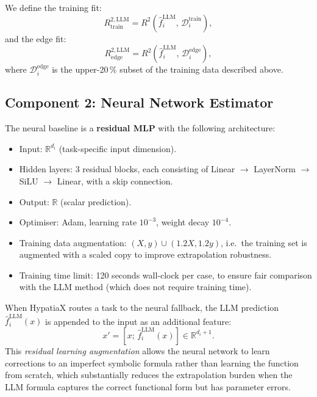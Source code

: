 \documentclass[twoside,11pt]{article}
\newcommand{\Rsq}{R^{2}}
\begin{document}
We define the training fit:
\begin{equation}
  {R^{2,\mathrm{LLM}}_{\mathrm{train}}} = \Rsq\!\left(\hat{f}^{\mathrm{LLM}}_i,\,
  \mathcal{D}^{\mathrm{train}}_i\right),
  \label{eq:r2_train_llm}
\end{equation}
and the edge fit:
\begin{equation}
  {R^{2,\mathrm{LLM}}_{\mathrm{edge}}} = \Rsq\!\left(\hat{f}^{\mathrm{LLM}}_i,\,
  \mathcal{D}^{\mathrm{edge}}_i\right),
  \label{eq:r2_edge_llm}
\end{equation}
where $\mathcal{D}^{\mathrm{edge}}_i$ is the upper-20\,\% subset of the training
data described above.

\subsection{Component 2: Neural Network Estimator}\label{subsec:component-2-neural-network-estimator}
\label{sec:nn}

The neural baseline is a \textbf{residual MLP} with the following architecture:
\begin{itemize}
  \item Input: $\mathbb{R}^{d_i}$ (task-specific input dimension).
  \item Hidden layers: 3 residual blocks, each consisting of Linear $\to$
    LayerNorm $\to$ SiLU $\to$ Linear, with a skip connection.
  \item Output: $\mathbb{R}$ (scalar prediction).
  \item Optimiser: Adam, learning rate $10^{-3}$, weight decay $10^{-4}$.
  \item Training data augmentation: $(X, y) \cup (1.2X, 1.2y)$, i.e.\ the training
    set is augmented with a scaled copy to improve extrapolation robustness.
  \item Training time limit: 120 seconds wall-clock per case, to ensure
    fair comparison with the LLM method (which does not require training time).
\end{itemize}

When HypatiaX routes a task to the neural fallback, the LLM prediction
$\hat{f}^{\mathrm{LLM}}_i(x)$ is appended to the input as an additional feature:
\begin{equation}
  x' = [x;\, \hat{f}^{\mathrm{LLM}}_i(x)] \in \mathbb{R}^{d_i + 1}.
  \label{eq:augmented_input}
\end{equation}
This \emph{residual learning augmentation} allows the neural network to learn
corrections to an imperfect symbolic formula rather than learning the function
from scratch, which substantially reduces the extrapolation burden when the LLM
formula captures the correct functional form but has parameter errors.
\end{document}
